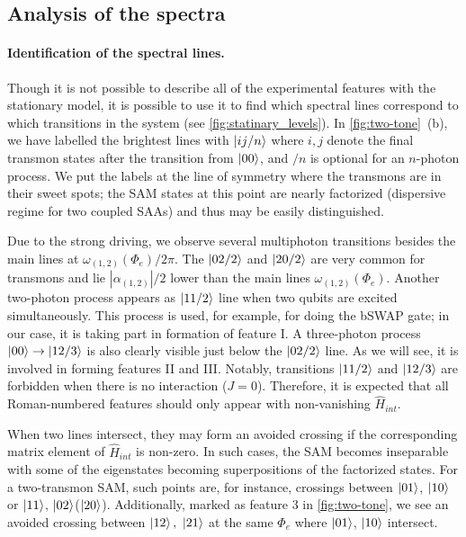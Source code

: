 \documentclass[%
 aip,
 amsmath,amssymb,
 reprint,%
]{revtex4-1}
\begin{document}
\subsection{Analysis of the spectra}

\paragraph{Identification of the spectral lines.} Though it is not possible to describe all of the experimental features with the stationary model, it is possible to use it to find which spectral lines correspond to which transitions in the system (see \autoref{fig:statinary_levels}). In \autoref{fig:two-tone}~(b), we have labelled the brightest lines with $\ket{ij/n}$ where $i,j$ denote the final transmon states after the transition from $\ket{00}$, and $/n$ is optional for an $n$-photon process. We put the labels at the line of symmetry where the transmons are in their sweet spots; the SAM states at this point are nearly factorized (dispersive regime for two coupled SAAs) and thus may be easily distinguished.

Due to the strong driving, we observe several multiphoton transitions besides the main lines at $\omega_{(1,2)}(\Phi_e)/2\pi$. The $\ket{02/2}$ and $\ket{20/2}$ are very common for transmons and lie $|\alpha_{(1,2)}|/2$ lower than the main lines $\omega_{(1,2)}(\Phi_e)$. Another two-photon process appears as $\ket{11/2}$ line when two qubits are excited simultaneously. This process is used, for example, for doing the bSWAP gate\cite{poletto2012entanglement}; in our case, it is taking part in formation of feature I. A three-photon process $\ket{00}\rightarrow\ket{12/3}$ is also clearly visible just below the $\ket{02/2}$ line. As we will see, it is involved in forming features II and III. Notably, transitions $\ket{11/2}$ and $\ket{12/3}$ are forbidden when there is no interaction ($J=0$). Therefore, it is expected that all Roman-numbered features should only appear with non-vanishing $\hat H_{int}$.

When two lines intersect, they may form an avoided crossing if the corresponding matrix element of $\hat H_{int}$ is non-zero. In such cases, the SAM becomes inseparable with some of the eigenstates becoming superpositions of the factorized states. For a two-transmon SAM, such points are, for instance, crossings between $\ket{01}$, $\ket{10}$ or $ \ket{11} $, $ \ket{02} $($ \ket{20} $). Additionally, marked as feature 3 in \autoref{fig:two-tone}, we see an avoided crossing between $\ket{12},\ \ket{21}$ at the same $\Phi_e$ where $\ket{01}$, $\ket{10}$ intersect.
\end{document}
